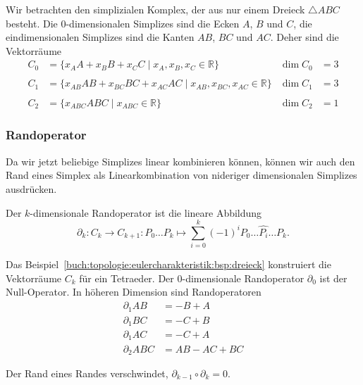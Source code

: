 \begin{beispiel}
\label{buch:topologie:eulercharakteristik:bsp:dreieck}
Wir betrachten den simplizialen Komplex, der aus nur einem Dreieck
$\triangle ABC$ besteht.
Die $0$-dimensionalen Simplizes sind die Ecken $A$, $B$ und $C$, 
die eindimensionalen Simplizes sind die Kanten $AB$, $BC$ und $AC$.
Deher sind die Vektorräume
\begin{align*}
C_0 &= \{ x_A A + x_B B + x_C C\mid x_A, x_B, x_C\in\mathbb{R}\}
&
\dim C_0 &= 3 \\
\\
C_1 &= \{ x_{AB} AB + x_{BC} BC + x_{AC} AC\mid x_{AB}, x_{BC}, x_{AC} \in\mathbb{R}\}
&
\dim C_1 &= 3 \\
\\
C_2 &= \{ x_{ABC} ABC\mid x_{ABC}\in\mathbb{R}\}
&
\dim C_2 &= 1
\end{align*}
\end{beispiel}

%
%
\subsubsection{Randoperator}
Da wir jetzt beliebige Simplizes linear kombinieren können, können
wir auch den Rand eines Simplex als Linearkombination von nideriger
dimensionalen Simplizes ausdrücken.

\begin{definition}[Randoperator]
Der $k$-dimensionale Randoperator ist die lineare Abbildung
\[
\partial_k
\colon
C_k \to C_{k+1}
:
P_0\dots P_k
\mapsto
\sum_{i=0}^k
(-1)^i
P_0\dots\widehat{P_i}\dots P_k.
\]
%
\end{definition}

\begin{beispiel}
Das Beispiel~\ref{buch:topologie:eulercharakteristik:bsp:dreieck}
konstruiert die Vektorräume $C_k$ für ein Tetraeder.
Der $0$-dimensionale Randoperator $\partial_0$ ist der Null-Operator.
In höheren Dimension sind Randoperatoren
\begin{align*}
\partial_1 AB &= -B + A \\
\partial_1 BC &= -C + B \\
\partial_1 AC &= -C + A \\
\partial_2 ABC &= AB - AC + BC
\end{align*}
\end{beispiel}

\begin{satz}
Der Rand eines Randes verschwindet, $\partial_{k-1}\circ\partial_k=0$.
\end{satz}

